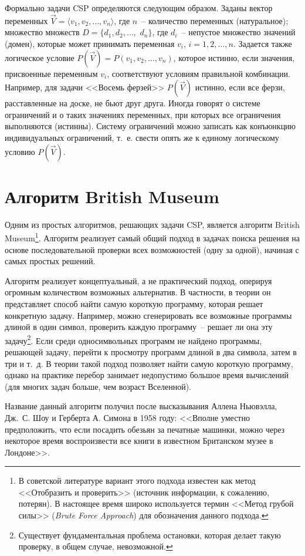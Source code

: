 \documentclass[a4paper,14pt, openany, twoside, final]{extbook} %
\newcommand{\eeng}[1]{\emph{\foreignlanguage{english}{#1}}}
\begin{document}
Формально задачи CSP определяются следующим образом. Заданы вектор переменных $\vec{V}=\langle v_1, v_2, \ldots, v_n\rangle$, где $n$~-- количество переменных (натуральное); множество множеств $D=\{ d_1, d_2, \ldots,$ $d_n\}$, где $d_i$~-- непустое множество значений (домен), которые может принимать переменная $v_i$, $i=1,2,\ldots,n$. Задается также логическое условие $P(\vec{V})=P(v_1,v_2,\ldots,v_n)$, которое истинно, если значения, присвоенные переменным $v_i$, соответствуют условиям правильной комбинации. Например, для задачи <<Восемь ферзей>> $P(\vec{V})$ истинно, если все ферзи, расставленные на доске, не бьют друг друга. Иногда говорят о системе ограничений и о таких значениях переменных, при которых все ограничения выполняются (истинны). Систему ограничений можно записать как конъюнкцию индивидуальных ограничений, т.~е. свести опять же к единому логическому условию $P(\vec{V})$.

\section{Алгоритм British Museum}

Одним из простых алгоритмов, решающих задачи CSP, является алгоритм British Museum\footnote{В советской литературе вариант этого подхода известен как метод <<Отобразить и проверить>> (источник информации, к сожалению, потерян). В настоящее время широко используется термин <<Метод грубой силы>> (\eeng{Brute Force Approach}) для обозначения данного подхода.}. Алгоритм реализует самый общий подход в задачах поиска решения на основе последовательной проверки всех возможностей (одну за одной), начиная с самых простых решений.

Алгоритм реализует концептуальный, а не практический подход, оперируя огромным количеством возможных альтернатив. В частности, в теории он представляет способ найти самую короткую программу, которая решает конкретную задачу. Например, можно сгенерировать все возможные программы длиной в один символ, проверить каждую программу~-- решает ли она эту задачу\footnote{Существует фундаментальная проблема остановки, которая делает такую проверку, в общем случае, невозможной.}. Если среди односимвольных программ не найдено программы, решающей задачу, перейти к просмотру программ длиной в два символа, затем в три и т.~д. В теории такой подход позволяет найти самую короткую программу, однако на практике перебор занимает недопустимо большое время вычислений (для многих задач больше, чем возраст Вселенной).

Название данный алгоритм получил после высказывания Аллена Ньювэлла, Дж.~С. Шоу и Герберта А. Симона в 1958 году: <<Вполне уместно предположить, что если посадить обезьян за печатные машинки, можно через некоторое время воспроизвести все книги в известном Британском музее в Лондоне>>.
\end{document}
